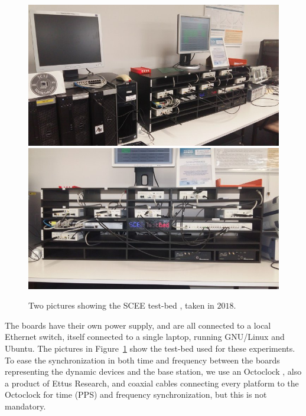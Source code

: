 \begin{figure}[!t]
    \centering
    \includegraphics[width=0.70\linewidth]{SCEE_TestBed1.jpg}
    \vspace*{20pt}
    \includegraphics[width=0.70\linewidth]{SCEE_TestBed2.jpg}
    \caption{Two pictures showing the SCEE test-bed \cite[Appendix~3]{Bodinier17}, taken in $2018$.}
    \label{fig:42:photosSCEETestBed}
\end{figure}

The boards have their own power supply, and are all connected to a local Ethernet switch, itself connected to a single laptop, running GNU/Linux and Ubuntu.
The pictures in Figure~\ref{fig:42:photosSCEETestBed} show the test-bed used for these experiments.
To ease the synchronization in both time and frequency between the boards representing the dynamic devices and the base station, we use an Octoclock \cite{OctoclockProduct}, also a product of Ettus Research,
and coaxial cables connecting every platform to the Octoclock for time (PPS) and frequency synchronization, but this is not mandatory.


